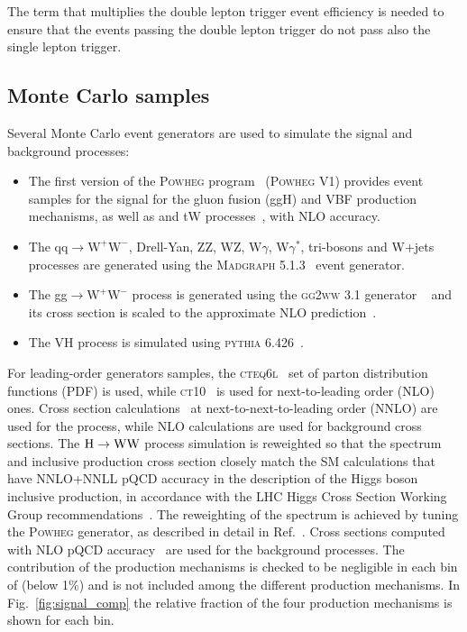 The term that multiplies the double lepton trigger event efficiency is needed to ensure that the events passing the double lepton trigger do not pass also the single lepton trigger.

\subsection{Monte Carlo samples\label{subsec:MC}}

Several Monte Carlo event generators are used to simulate the signal and background processes:
\begin{itemize}
\item The first version of the \textsc{Powheg} program~\cite{Kramer:2005hw,Frixione:2007vw,Lavesson:2008ah,Alioli:2008tz, Nason:2009ai} (\textsc{Powheg V1}) provides event samples for the \hww signal
for the gluon fusion (ggH) and VBF production mechanisms, as well as \ttbar and tW processes~\cite{Alioli:2011as}, with NLO accuracy.
\item The $\mathrm{qq} \to \mathrm{W^{+}W^{-}}$, Drell-Yan, ZZ, WZ, W$\gamma$, W$\gamma^*$, tri-bosons and W+jets processes are generated using
the \textsc{Madgraph 5.1.3}~\cite{Alwall:2014hca} event generator.
\item The gg$\to \mathrm{W^{+}W^{-}}$ process is generated using the \textsc{gg2ww} 3.1 generator ~\cite{Binoth:2006mf} and its cross section is scaled to the approximate NLO prediction~\cite{Bonvini:2013jha,Passarino:2013bha}.
\item The VH process is simulated using \textsc{pythia 6.426}~\cite{Sjostrand:2006za}.
\end{itemize}
For leading-order generators samples, the \textsc{cteq6l}~\cite{Lai:2010nw} set of parton distribution functions
(PDF) is used, while \textsc{ct10}~\cite{Lai:2010vv} is used for next-to-leading order (NLO) ones.
Cross section calculations~\cite{Dittmaier:2011ti} at next-to-next-to-leading order (NNLO) are used for the \hww process, while NLO calculations are used for background cross sections.
The ${\mathrm{H}\to\mathrm{WW}}$ process simulation is reweighted so that the \pth{} spectrum and inclusive production cross section closely match the SM calculations that have NNLO+NNLL pQCD accuracy in the description of the Higgs boson inclusive production, in accordance with the LHC Higgs Cross Section Working Group recommendations~\cite{Heinemeyer:2013tqa}.
The reweighting of the \pth{} spectrum is achieved by tuning the \textsc{Powheg} generator, as described in detail in Ref.~\cite{Alioli:2010xd}.
Cross sections computed with NLO pQCD accuracy~\cite{Heinemeyer:2013tqa} are used for the background processes.
The contribution of the \ttH production mechanisms is checked to be negligible in each bin of \pth (below 1\%) and is not included among the different production mechanisms. In Fig.~\ref{fig:signal_comp} the relative fraction of the four production mechanisms is shown for each \pth bin.

